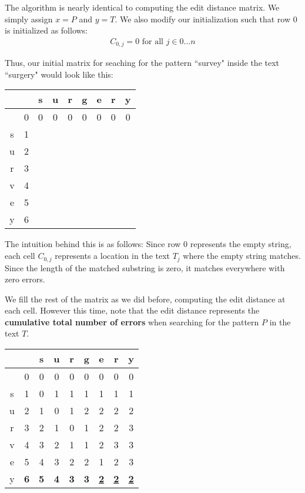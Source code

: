 \documentclass[10pt]{article}
\begin{document}
The algorithm is nearly identical to computing the edit distance matrix. We
simply assign $x = P$ and $y = T$. We also modify our initialization such that
row 0 is initialized as follows:
\begin{align*}
C_{0, j} = 0 \text{ for all } j \in 0 \ldots n
\end{align*}

Thus, our initial matrix for seaching for the pattern ``survey" inside the text
``surgery" would look like this:

\begin{center}
\begin{tabular}{c|c|c|c|c|c|c|c|c|}
  &   & s & u & r & g & e & r & y \\ \hline
  & 0 & 0 & 0 & 0 & 0 & 0 & 0 & 0 \\ \hline
s & 1 &   &   &   &   &   &   &   \\ \hline
u & 2 &   &   &   &   &   &   &   \\ \hline
r & 3 &   &   &   &   &   &   &   \\ \hline
v & 4 &   &   &   &   &   &   &   \\ \hline
e & 5 &   &   &   &   &   &   &   \\ \hline
y & 6 &   &   &   &   &   &   &   \\ \hline
\end{tabular}
\end{center}

The intuition behind this is as follows: Since row 0 represents the empty
string, each cell $C_{0, j}$ represents a location in the text $T_{j}$ where
the empty string matches. Since the length of the matched substring is zero, it
matches everywhere with zero errors.

We fill the rest of the matrix as we did before, computing the edit distance
at each cell. However this time, note that the edit distance represents the
\textbf{cumulative total number of errors} when searching for the pattern $P$
in the text $T$.

\begin{center}
\begin{tabular}{c|c|c|c|c|c|c|c|c|}
  &   & s & u & r & g & e & r & y \\ \hline
  & 0 & 0 & 0 & 0 & 0 & 0 & 0 & 0 \\ \hline
s & 1 & 0 & 1 & 1 & 1 & 1 & 1 & 1 \\ \hline
u & 2 & 1 & 0 & 1 & 2 & 2 & 2 & 2 \\ \hline
r & 3 & 2 & 1 & 0 & 1 & 2 & 2 & 3 \\ \hline
v & 4 & 3 & 2 & 1 & 1 & 2 & 3 & 3 \\ \hline
e & 5 & 4 & 3 & 2 & 2 & 1 & 2 & 3 \\ \hline
y & \textbf{6} & \textbf{5} & \textbf{4} & \textbf{3} & \textbf{3} & \textbf{\underline{2}} & \textbf{\underline{2}} & \textbf{\underline{2}} \\ \hline
\end{tabular}
\end{center}
\end{document}
